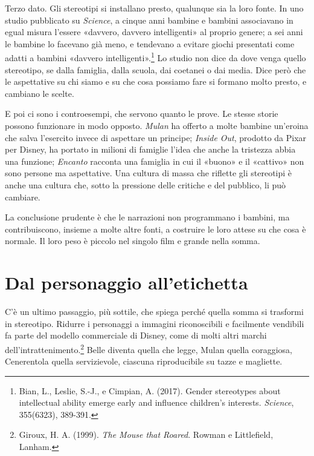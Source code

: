 Terzo dato. Gli stereotipi si installano presto, qualunque sia la loro fonte. In uno studio pubblicato su \textit{Science}, a cinque anni bambine e bambini associavano in egual misura l'essere «davvero, davvero intelligenti» al proprio genere; a sei anni le bambine lo facevano già meno, e tendevano a evitare giochi presentati come adatti a bambini «davvero intelligenti».\footnote{Bian, L., Leslie, S.-J., e Cimpian, A. (2017). Gender stereotypes about intellectual ability emerge early and influence children's interests. \textit{Science}, 355(6323), 389-391.} Lo studio non dice da dove venga quello stereotipo, se dalla famiglia, dalla scuola, dai coetanei o dai media. Dice però che le aspettative su chi siamo e su che cosa possiamo fare si formano molto presto, e cambiano le scelte.

E poi ci sono i controesempi, che servono quanto le prove. Le stesse storie possono funzionare in modo opposto. \textit{Mulan} ha offerto a molte bambine un'eroina che salva l'esercito invece di aspettare un principe; \textit{Inside Out}, prodotto da Pixar per Disney, ha portato in milioni di famiglie l'idea che anche la tristezza abbia una funzione; \textit{Encanto} racconta una famiglia in cui il «buono» e il «cattivo» non sono persone ma aspettative. Una cultura di massa che riflette gli stereotipi è anche una cultura che, sotto la pressione delle critiche e del pubblico, li può cambiare.

La conclusione prudente è che le narrazioni non programmano i bambini, ma contribuiscono, insieme a molte altre fonti, a costruire le loro attese su che cosa è normale. Il loro peso è piccolo nel singolo film e grande nella somma.

\section{Dal personaggio all'etichetta}

C'è un ultimo passaggio, più sottile, che spiega perché quella somma si trasformi in stereotipo. Ridurre i personaggi a immagini riconoscibili e facilmente vendibili fa parte del modello commerciale di Disney, come di molti altri marchi dell'intrattenimento.\footnote{Giroux, H. A. (1999). \textit{The Mouse that Roared}. Rowman e Littlefield, Lanham.} Belle diventa quella che legge, Mulan quella coraggiosa, Cenerentola quella servizievole, ciascuna riproducibile su tazze e magliette.

